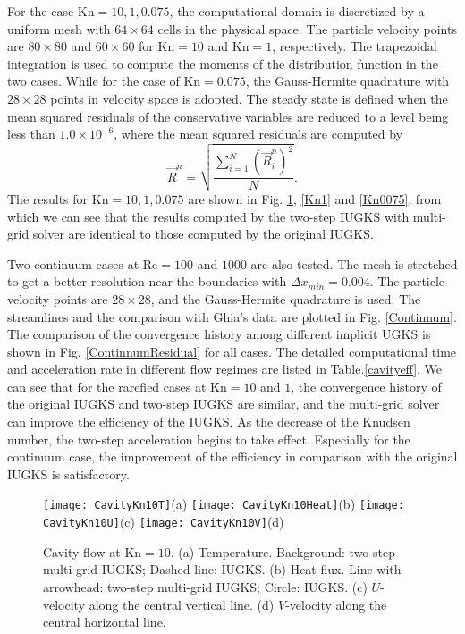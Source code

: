 \documentclass[3p,12pt]{elsarticle}
\begin{document}
	For the case $\mathrm{Kn} = 10, 1, 0.075$, the computational domain is discretized by a uniform mesh with $64 \times 64$ cells in the physical space. The particle velocity points are $80 \times 80$ and $60 \times 60$ for  $\mathrm{Kn} = 10$ and $\mathrm{Kn} = 1$, respectively. The trapezoidal integration is used to compute the moments of the distribution function in the two cases. While for the case of $\mathrm{Kn} = 0.075$, the Gauss-Hermite quadrature with $28 \times 28$ points in velocity space is adopted. The steady state is defined when the mean squared residuals of the conservative variables are reduced to a level being less than $1.0 \times 10^{-6}$, where the mean squared residuals are computed by
	\begin{equation}
		\vec{R}^n = \sqrt{\frac{\sum_{i=1}^{N} (\vec{R}_i^n)^2}{N}}.
	\end{equation}
	The results for $\mathrm{Kn} = 10, 1, 0.075$ are shown in Fig. \ref{Kn10}, \ref{Kn1} and \ref{Kn0075}, from which we can see that the results computed by the two-step IUGKS with multi-grid solver are identical to those computed by the original IUGKS.
	
	Two continuum cases at $\mathrm{Re} = 100$ and $1000$ are also tested. The mesh is stretched to get a better resolution near the boundaries with $\Delta x_{min} = 0.004$. The particle velocity points are $28 \times 28$, and the Gauss-Hermite quadrature is used. The streamlines and the comparison with Ghia's data \cite{ghia1982high} are plotted in Fig. \ref{Continnum}. The comparison of the convergence history among different implicit UGKS is shown in Fig. \ref{ContinnumResidual} for all cases. The detailed computational time and acceleration rate in different flow regimes are listed in Table.\ref{cavityeff}. We can see that for the rarefied cases at $\mathrm{Kn} = 10$ and $1$, the convergence history of the original IUGKS and two-step IUGKS are similar, and the multi-grid solver can improve the efficiency of the IUGKS. As the decrease of the Knudsen number, the two-step acceleration begins to take effect. Especially for the continuum case, the improvement of the efficiency in comparison with the original IUGKS is satisfactory.
	
	
	
	\begin{figure}
		\centering
		\texttt{[image: CavityKn10T]}{(a)}
		\texttt{[image: CavityKn10Heat]}{(b)}
		\texttt{[image: CavityKn10U]}{(c)}
		\texttt{[image: CavityKn10V]}{(d)}
		\caption{Cavity flow at $\mathrm{Kn} = 10$. (a) Temperature. Background: two-step multi-grid IUGKS; Dashed line: IUGKS. (b) Heat flux. Line with arrowhead: two-step multi-grid IUGKS; Circle: IUGKS. (c) $U$-velocity along the central vertical line. (d) $V$-velocity along the central horizontal line.}
		\label{Kn10}
	\end{figure}
	
\end{document}
